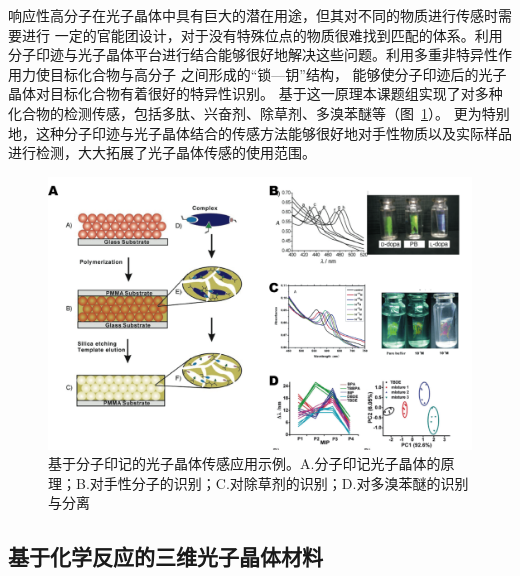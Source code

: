 响应性高分子在光子晶体中具有巨大的潜在用途，但其对不同的物质进行传感时需要进行
一定的官能团设计，对于没有特殊位点的物质很难找到匹配的体系。利用分子印迹与光子晶体平台进行结合能够很好地解决这些问题。利用多重非特异性作用力使目标化合物与高分子
之间形成的“锁—钥”结构，
能够使分子印迹后的光子晶体对目标化合物有着很好的特异性识别。
基于这一原理本课题组实现了对多种化合物的检测传感，包括多肽\cite{Hu2007Construction}、兴奋剂\cite{Hu2008Ultrasensitive}、除草剂\cite{Wu2008LabelFree}、多溴苯醚\cite{Xu2014LabelFree}等（图~\ref{fig:mol_imprint}）。
更为特别地，这种分子印迹与光子晶体结合的传感方法能够很好地对手性物质\cite{Hu2006Imprinted}以及实际样品\cite{Xu2014Molecularly}进行检测，大大拓展了光子晶体传感的使用范围。
\begin{figure}[htbp]
	\centering
	\includegraphics[width=0.8\linewidth]{figures/mol-imprint.png}
	\caption{基于分子印记的光子晶体传感应用示例。A.分子印记光子晶体的原理；B.对手性分子的识别\cite{Hu2006Imprinted}；C.对除草剂的识别\cite{Wu2008LabelFree}；D.对多溴苯醚的识别与分离\cite{Xu2014LabelFree}}
	\label{fig:mol_imprint}
\end{figure}

\subsection{基于化学反应的三维光子晶体材料}
\label{subsec:chem-reaction}

